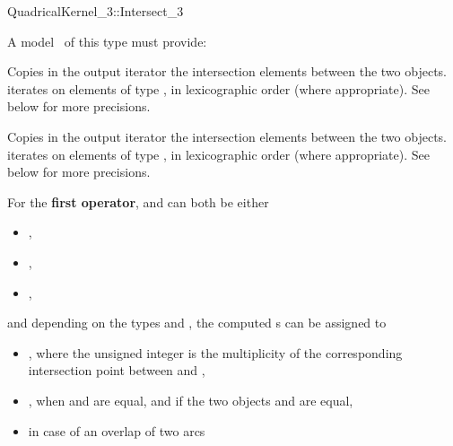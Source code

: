 \begin{ccRefFunctionObjectConcept}{QuadricalKernel_3::Intersect_3}

\ccRefines



A model \ccVar\ of this type must provide:

{Copies in the output iterator the intersection elements between the
two objects.  iterates on
elements of type , in lexicographic order
(where appropriate). See below for more precisions.}

{Copies in the output iterator the intersection elements between the
two objects.  iterates on
elements of type , in lexicographic order 
(where appropriate). See below for more precisions.}

For the \textbf{first operator},  and  can both 
be either

\begin{itemize}
\item {} ,
\item {} ,
\item {} ,
\end{itemize} 

and depending on the types  and , the computed 
s can be assigned to 
\begin{itemize}
\item {} ,
where the unsigned integer is the multiplicity of the corresponding
intersection point between  and ,
\item {} , when  and  are equal, and 
if the two objects  and  are equal,
\item {}  in case of an overlap of 
two arcs
\end{itemize} 


\end{ccRefFunctionObjectConcept}
